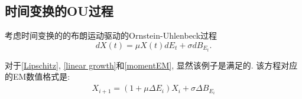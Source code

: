 	\subsection{时间变换的OU过程}
	\begin{example}
		考虑时间变换的的布朗运动驱动的Ornstein-Uhlenbeck过程
		\begin{equation}\label{linear}
			dX(t) = \mu X(t)dE_t + \sigma dB_{E_t}. 
		\end{equation}
	\end{example}
	对于\cref{Lipschitz}, \cref{linear growth}和\cref{momentEM}, 显然该例子是满足的. 该方程对应的EM数值格式是:
	\begin{align*}
		X_{i+1} = (1 + \mu \Delta E_i) X_i + \sigma \Delta B_{E_i}
	\end{align*}
	
